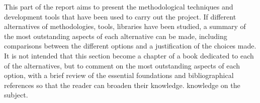 
\nonzeroparskip This part of the report aims to present the methodological techniques and development tools that have been used to carry out the project. If different alternatives of methodologies, tools, libraries have been studied, a summary of the most outstanding aspects of each alternative can be made, including comparisons between the different options and a justification of the choices made.
It is not intended that this section become a chapter of a book dedicated to each of the alternatives, but to comment on the most outstanding aspects of each option, with a brief review of the essential foundations and bibliographical references so that the reader can broaden their knowledge. knowledge on the subject.


